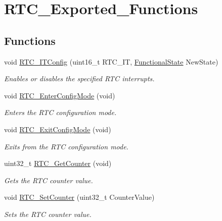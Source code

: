 \hypertarget{group___r_t_c___exported___functions}{}\section{R\+T\+C\+\_\+\+Exported\+\_\+\+Functions}
\label{group___r_t_c___exported___functions}
\subsection*{Functions}
\begin{DoxyCompactItemize}
\item 
void \mbox{\hyperlink{group___r_t_c___exported___functions_ga175dfe88866234730c1ec40d2221c4f4}{R\+T\+C\+\_\+\+I\+T\+Config}} (uint16\+\_\+t R\+T\+C\+\_\+\+IT, \mbox{\hyperlink{group___exported__types_gac9a7e9a35d2513ec15c3b537aaa4fba1}{Functional\+State}} New\+State)
\begin{DoxyCompactList}\small\item\em Enables or disables the specified R\+TC interrupts. \end{DoxyCompactList}\item 
void \mbox{\hyperlink{group___r_t_c___exported___functions_ga23612d9da2fe057a0cd72c684e5b438a}{R\+T\+C\+\_\+\+Enter\+Config\+Mode}} (void)
\begin{DoxyCompactList}\small\item\em Enters the R\+TC configuration mode. \end{DoxyCompactList}\item 
void \mbox{\hyperlink{group___r_t_c___exported___functions_ga7585aa6e2dbb497173b2fd03bac0d304}{R\+T\+C\+\_\+\+Exit\+Config\+Mode}} (void)
\begin{DoxyCompactList}\small\item\em Exits from the R\+TC configuration mode. \end{DoxyCompactList}\item 
uint32\+\_\+t \mbox{\hyperlink{group___r_t_c___exported___functions_ga6edb19a0ad8414a40610341121c5ea6c}{R\+T\+C\+\_\+\+Get\+Counter}} (void)
\begin{DoxyCompactList}\small\item\em Gets the R\+TC counter value. \end{DoxyCompactList}\item 
void \mbox{\hyperlink{group___r_t_c___exported___functions_gafa81ec17158de1d1a7740eca81b9fb65}{R\+T\+C\+\_\+\+Set\+Counter}} (uint32\+\_\+t Counter\+Value)
\begin{DoxyCompactList}\small\item\em Sets the R\+TC counter value. \end{DoxyCompactList}\item 

\end{DoxyCompactItemize}
